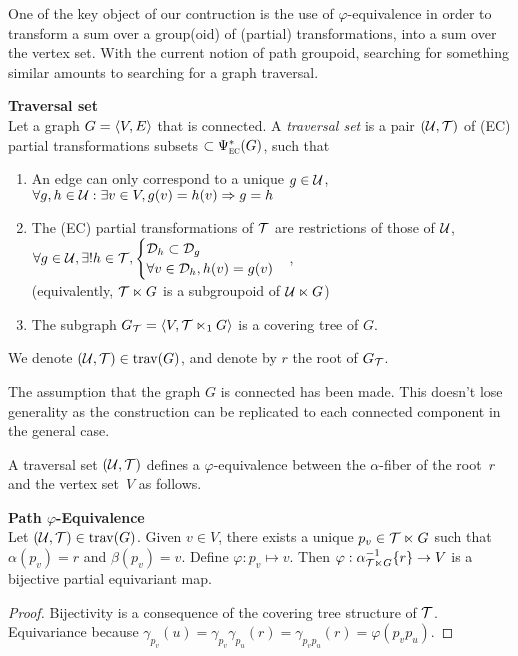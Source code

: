 One of the key object of our contruction is the use of $\varphi$-equivalence in order to transform a sum over a group(oid) of (partial) transformations, into a sum over the vertex set. With the current notion of path groupoid, searching for something similar amounts to searching for a graph traversal.

\begin{definition}\textbf{Traversal set}\\
Let a graph $G = \langle V, E \rangle$ that is connected. A \emph{traversal set} is a pair $(\mathcal{U}, \mathcal{T})$ of (EC) partial transformations subsets $\subset \Psi_{\operatorname{\textsc{ec}}}^*(G)$, such that
\begin{enumerate}
  \item An edge can only correspond to a unique $g\in \mathcal{U}$,\\
    \ie $\forall g,h \in \mathcal{U} : \exists v \in V, g(v) = h(v) \Rightarrow g=h$
  \item The (EC) partial transformations of $\mathcal{T}$ are restrictions of those of $\mathcal{U}$,\\
    \ie $\forall g \in \mathcal{U}, \exists! h \in \mathcal{T}, \begin{cases}\mathcal{D}_h \subset \mathcal{D}_g\\ \forall v \in \mathcal{D}_h, h(v) = g(v)\end{cases}$, \\
    (equivalently, $\mathcal{T} \ltimes G$ is a subgroupoid of $\mathcal{U} \ltimes G$)
  \item The subgraph $G_{\mathcal{T}} = \langle V, \mathcal{T} \ltimes_1 G \rangle$ is a covering tree of $G$.
\end{enumerate}
We denote $(\mathcal{U}, \mathcal{T}) \in \operatorname{trav}(G)$, and denote by $r$ the root of $G_{\mathcal{T}}$.
\end{definition}

\begin{remark}The assumption that the graph $G$ is connected has been made. This doesn't lose generality as the construction can be replicated to each connected component in the general case.
\end{remark}

A traversal set $(\mathcal{U}, \mathcal{T})$ defines a $\varphi$-equivalence between the $\alpha$-fiber of the root~$r$ and the vertex set~$V$ as follows.

\begin{lemma}\textbf{Path $\varphi$-Equivalence}\\
Let $(\mathcal{U}, \mathcal{T}) \in \operatorname{trav}(G)$. Given $v \in V$, there exists a unique $p_v \in \mathcal{T} \ltimes G$ such that $\alpha(p_v) = r$ and $\beta(p_v) = v$. Define $\varphi: p_v \mapsto v$. Then $\varphi: \alpha^{-1}_{\mathcal{T} \ltimes G}\{r\} \rightarrow V$ is a bijective partial equivariant map.
\end{lemma}
\begin{proof}
Bijectivity is a consequence of the covering tree structure of $\mathcal{T}$.
Equivariance because $\gamma_{p_v}(u) = \gamma_{p_v}\gamma_{p_u}(r) = \gamma_{p_vp_u}(r) = \varphi(p_vp_u)$.
\end{proof}

